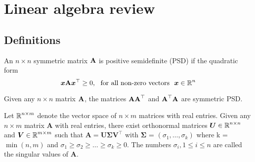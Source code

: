 \section{Linear algebra review}\label{SVD}
\subsection{Definitions}


\begin{Def}
An $n\times n$ symmetric matrix $\textbf{A}$ is positive semidefinite (PSD) if the quadratic form
\[
\vect{x} \Bm{A} \vect{x}^{\top} \geq 0,\ \ \text{for all non-zero vectors} \ \ \vect{x} \in \R^{n}
\]

Given any $n\times n$ matrix $\textbf{A}$, the matrices $\textbf{A}\textbf{A}^{\top}$
and $\textbf{A}^{\top}\textbf{A}$ are symmetric PSD.

\end{Def}

\begin{Def}
Let $\operatorname{\mathbb{R}}^{n \times m}$ denote the vector space of $n \times m$ matrices with real entries. Given any $n\times m$ matrix $\bm{A}$ with real entries, there exist orthonormal matrices $\bm{U} \in \operatorname{\mathbb{R}}^{n \times n}$ and $\bm{V} \in \operatorname{\mathbb{R}}^{m \times m}$ such that 
$\bm{\displaystyle A = U \Sigma V^{\top}}$ with $\bm{\Sigma}$ = $(\sigma_{1}, \ldots, \sigma_{k})$ where  k = $\min(n, m)$ and
 $\sigma_{1} \geq \sigma_{2} \geq \ldots \geq \sigma_{k} \geq 0$.
The numbers $\sigma_{i}, 1\leq i\leq n$ are called the singular values of $\bm{A}$. 
\end{Def}


